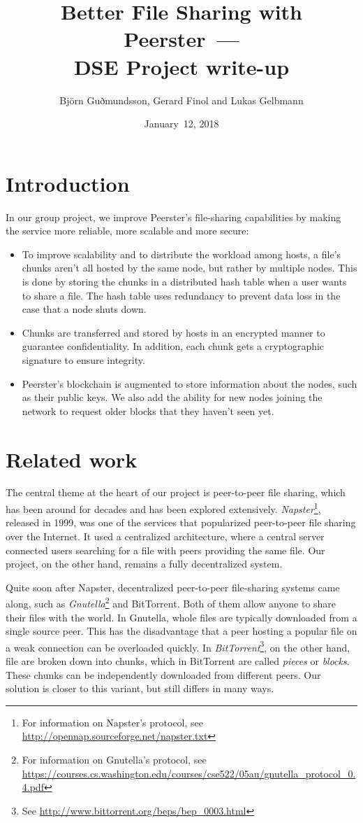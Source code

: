 \documentclass[12pt,a4paper,draft]{article}
\title{Better File Sharing with Peerster~---\\DSE Project write-up}
\author{Björn Guðmundsson, Gerard Finol and Lukas Gelbmann}
\date{January~12, 2018}
\begin{document}
\maketitle
\tableofcontents

\section{Introduction}

In our group project, we improve Peerster's file-sharing capabilities by making the service more reliable, more scalable and more secure:

\begin{itemize}
    \item To improve scalability and to distribute the workload among hosts, a file's chunks aren't all hosted by the same node, but rather by multiple nodes.
    This is done by storing the chunks in a distributed hash table when a user wants to share a file.
    The hash table uses redundancy to prevent data loss in the case that a node shuts down.
    \item Chunks are transferred and stored by hosts in an encrypted manner to guarantee confidentiality.
    In addition, each chunk gets a cryptographic signature to ensure integrity.
    \item Peerster's blockchain is augmented to store information about the nodes, such as their public keys.
    We also add the ability for new nodes joining the network to request older blocks that they haven't seen yet.
\end{itemize}

\section{Related work}

The central theme at the heart of our project is peer-to-peer file sharing, which has been around for decades and has been explored extensively.
\emph{Napster}\footnote{For information on Napster's protocol, see \url{http://opennap.sourceforge.net/napster.txt}}, released in 1999, was one of the services that popularized peer-to-peer file sharing over the Internet.
It used a centralized architecture, where a central server connected users searching for a file with peers providing the same file.
Our project, on the other hand, remains a fully decentralized system.

Quite soon after Napster, decentralized peer-to-peer file-sharing systems came along, such as \emph{Gnutella}\footnote{For information on Gnutella's protocol, see \url{https://courses.cs.washington.edu/courses/cse522/05au/gnutella\_protocol\_0.4.pdf}} and BitTorrent.
Both of them allow anyone to share their files with the world.
In Gnutella, whole files are typically downloaded from a single source peer.
This has the disadvantage that a peer hosting a popular file on a weak connection can be overloaded quickly.
In \emph{BitTorrent}\footnote{See \url{http://www.bittorrent.org/beps/bep_0003.html}}, on the other hand, file are broken down into chunks, which in BitTorrent are called \emph{pieces} or \emph{blocks}.
These chunks can be independently downloaded from different peers.
Our solution is closer to this variant, but still differs in many ways.
\end{document}
